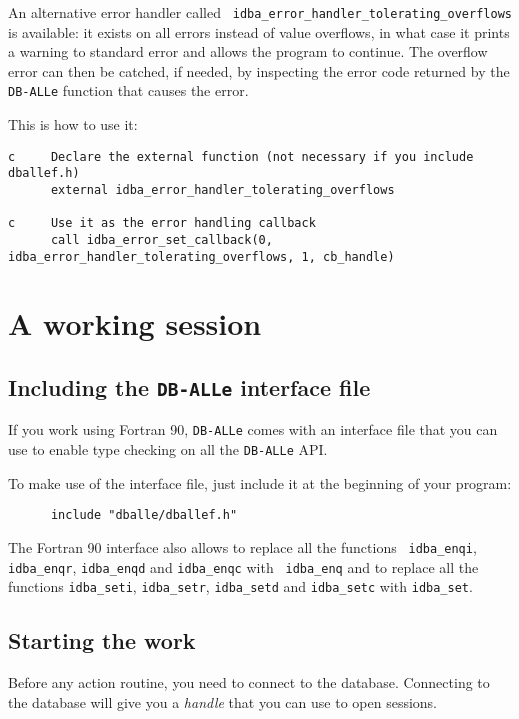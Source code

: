 \documentclass[final,12pt,a4paper,twoside]{book}
\newcommand{\dballe}{{\tt DB-ALLe}}
\begin{document}
An alternative error handler called {\tt
idba\_error\_handler\_tolerating\_overflows} is available: it exists on all
errors instead of value overflows, in what case it prints a warning to standard
error and allows the program to continue.  The overflow error can then be
catched, if needed, by inspecting the error code returned by the \dballe{}
function that causes the error.

This is how to use it:

\begin{verbatim}
c     Declare the external function (not necessary if you include dballef.h)
      external idba_error_handler_tolerating_overflows

c     Use it as the error handling callback
      call idba_error_set_callback(0, idba_error_handler_tolerating_overflows, 1, cb_handle)
\end{verbatim}


\chapter {A working session}
\label{ch-work}

\section{Including the \dballe{} interface file}

If you work using Fortran 90, \dballe{} comes with an interface file that you
can use to enable type checking on all the \dballe{} API.

To make use of the interface file, just include it at the beginning of your
program:

\begin{verbatim}
      include "dballe/dballef.h"
\end{verbatim}

The Fortran 90 interface also allows to replace all the functions {\tt
idba\_enqi}, {\tt idba\_enqr}, {\tt idba\_enqd} and {\tt idba\_enqc} with {\tt
idba\_enq} and to replace all the functions {\tt idba\_seti}, {\tt idba\_setr},
{\tt idba\_setd} and {\tt idba\_setc} with {\tt idba\_set}.

\section{Starting the work}

Before any action routine, you need to connect to the database.  Connecting to
the database will give you a \emph{handle} that you can use to open sessions.
\end{document}
